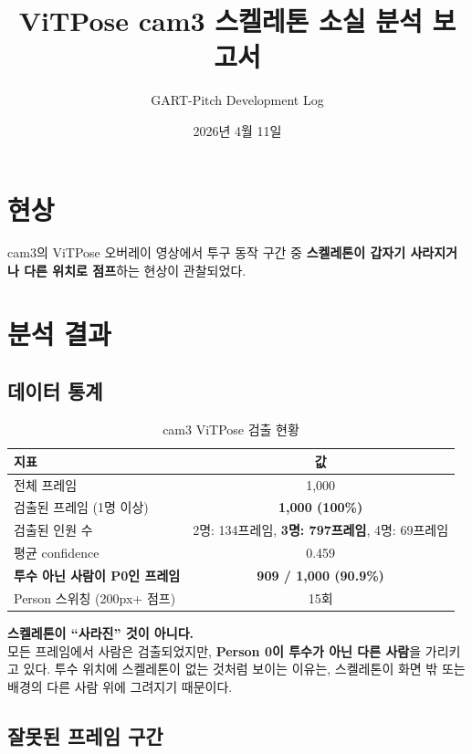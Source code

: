 \documentclass[11pt, a4paper]{article}
\title{\color{defblue}\textbf{ViTPose cam3 스켈레톤 소실 분석 보고서}}
\author{GART-Pitch Development Log}
\date{2026년 4월 11일}
\begin{document}
\maketitle

\section{현상}

cam3의 ViTPose 오버레이 영상에서 투구 동작 구간 중 \textbf{스켈레톤이 갑자기 사라지거나 다른 위치로 점프}하는 현상이 관찰되었다.

\section{분석 결과}

\subsection{데이터 통계}

\begin{table}[H]
\centering
\caption{cam3 ViTPose 검출 현황}
\renewcommand{\arraystretch}{1.3}
\begin{tabular}{lc}
\toprule
\textbf{지표} & \textbf{값} \\
\midrule
전체 프레임 & 1,000 \\
검출된 프레임 (1명 이상) & \textbf{1,000 (100\%)} \\
검출된 인원 수 & 2명: 134프레임, \textbf{3명: 797프레임}, 4명: 69프레임 \\
평균 confidence & 0.459 \\
\midrule
\textbf{투수 아닌 사람이 P0인 프레임} & \textbf{909 / 1,000 (90.9\%)} \\
Person 스위칭 (200px+ 점프) & 15회 \\
\bottomrule
\end{tabular}
\end{table}

\begin{warningbox}
\textbf{스켈레톤이 ``사라진'' 것이 아니다.}\\
모든 프레임에서 사람은 검출되었지만, \textbf{Person 0이 투수가 아닌 다른 사람}을 가리키고 있다.
투수 위치에 스켈레톤이 없는 것처럼 보이는 이유는, 스켈레톤이 화면 밖 또는 배경의 다른 사람 위에 그려지기 때문이다.
\end{warningbox}

\subsection{잘못된 프레임 구간}
\end{document}
